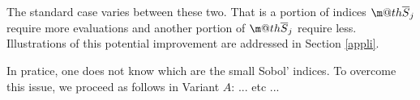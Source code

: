 \documentclass[]{elsarticle}
\makeatletter
\theoremstyle{definition}
\newcommand{\bvec}[1]{\boldsymbol{#1}}
\newcommand{\vx}{\bvec{x}}
\newcommand*{\ov}[1]{
  \m@th\overline{\mbox{#1}\raisebox{2mm}{}}
}
\makeatother
\begin{document}
The standard case varies between these two. That is a portion of indices $\ov{$S$}_j$ require more evaluations and another portion of $\ov{$S$}_j$ require less. Illustrations of this potential improvement are addressed in Section \ref{appli}. 
\bigskip

In pratice, one does not know which are the small Sobol' indices. To overcome this issue, we proceed as follows in Variant $A$:
... etc ...


%
%
%

\end{document}
